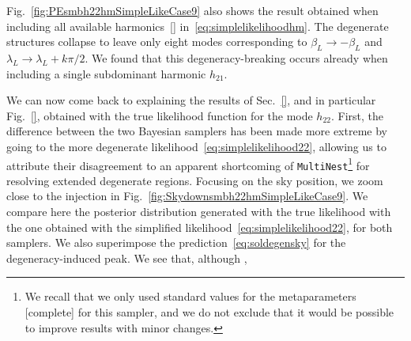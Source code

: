 \documentclass[aps,showpacs,twocolumn,prd,superscriptaddress,nofootinbib]{revtex4-1}
\newcommand{\be}{\begin{equation}}
\newcommand{\ee}{\end{equation}}
\newcommand\calL{{\mathcal{L}}}
\newcommand\betaL{{\beta_{L}}}
\newcommand\lambdaL{{\lambda_{L}}}
\newcommand\varphiL{{\varphi_{L}}}
\newcommand\psiL{{\psi_{L}}}
\newcommand{\SM}[1]{{\color{Blue} #1}}
\begin{document}
Fig.~\ref{fig:PEsmbh22hmSimpleLikeCase9} also shows the result obtained when including all available harmonics~\eqref{} in~\eqref{eq:simplelikelihoodhm}. The degenerate structures collapse to leave only eight modes corresponding to $\betaL \rightarrow - \betaL$ and $\lambdaL \rightarrow \lambdaL + k\pi/2$. We found that this degeneracy-breaking occurs already when including a single subdominant harmonic $h_{21}$.

We can now come back to explaining the results of Sec.~\ref{}, and in particular Fig.~\ref{}, obtained with the true likelihood function for the mode $h_{22}$. First, the difference between the two Bayesian samplers has been made more extreme by going to the more degenerate likelihood~\eqref{eq:simplelikelihood22}, allowing us to attribute their disagreement to an apparent shortcoming of \texttt{MultiNest}\footnote{We recall that we only used standard values for the metaparameters \SM{[complete]} for this sampler, and we do not exclude that it would be possible to improve results with minor changes.} for resolving extended degenerate regions. Focusing on the sky position, we zoom close to the injection in Fig.~\ref{fig:Skydownsmbh22hmSimpleLikeCase9}. We compare here the posterior distribution generated with the true likelihood with the one obtained with the simplified likelihood~\eqref{eq:simplelikelihood22}, for both samplers.  We also superimpose the prediction~\eqref{eq:soldegensky} for the degeneracy-induced peak. We see that, although , 

%
\end{document}
